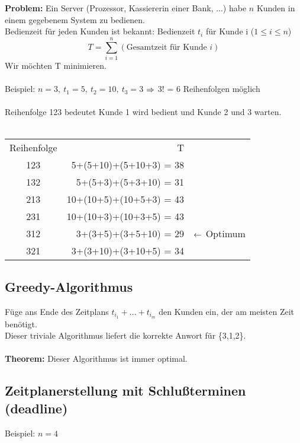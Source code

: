 \documentclass[a4paper,twoside,DIV15,BCOR12mm]{scrbook}
\begin{document}
\textbf{Problem:} Ein Server (Prozessor, Kassiererin einer Bank, ...) habe $n$ Kunden in einem gegebenem System zu bedienen. \\
Bedienzeit für jeden Kunden ist bekannt: Bedienzeit $t_i$ für Kunde i ($1 \leq i \leq n$)
$$T = \sum_{i=1}^n (\text{Gesamtzeit für Kunde } i)$$
Wir möchten T minimieren. \\
\\
Beispiel: $n=3,\ t_1=5,\ t_2=10,\ t_3=3$ $\Rightarrow$ 3! = 6 Reihenfolgen möglich \\
\\
Reihenfolge 123 bedeutet Kunde 1 wird bedient und Kunde 2 und 3 warten. \\
\\
\begin{tabular}{crl}
Reihenfolge & T \\
123 & 5+(5+10)+(5+10+3)	= 38 \\
132 & 5+(5+3)+(5+3+10) = 31 \\
213 & 10+(10+5)+(10+5+3) = 43 \\
231 & 10+(10+3)+(10+3+5) = 43 \\
312 & 3+(3+5)+(3+5+10) = 29 & $\leftarrow$ Optimum\\
321 & 3+(3+10)+(3+10+5) = 34 \\
\end{tabular}

\subsection{Greedy-Algorithmus}
Füge ans Ende des Zeitplans $t_{i_1}+\ldots+t_{i_m}$ den Kunden ein, der am meisten Zeit benötigt. \\
Dieser triviale Algorithmus liefert die korrekte Anwort für \{3,1,2\}. \\
\\
\textbf{Theorem:} Dieser Algorithmus ist immer optimal.
\subsection{Zeitplanerstellung mit Schlußterminen (deadline)}
Beispiel: $n=4$ \\
\end{document}
